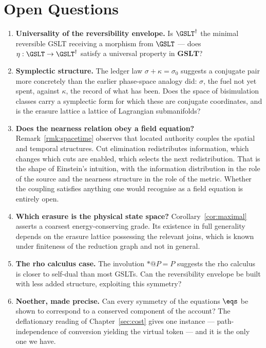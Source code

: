 \section{Open Questions}

\begin{enumerate}[itemsep=4pt]
  \item \textbf{Universality of the reversibility envelope.}  Is
        $\GSLT^\dagger$ the minimal reversible GSLT receiving a morphism
        from $\GSLT$ --- does $\eta : \GSLT \to \GSLT^\dagger$ satisfy a
        universal property in $\mathbf{GSLT}$?

  \item \textbf{Symplectic structure.}  The ledger law
        $\sigma + \kappa = \sigma_0$ suggests a conjugate pair more
        concretely than the earlier phase-space analogy did: $\sigma$, the
        fuel not yet spent, against $\kappa$, the record of what has been.
        Does the space of bisimulation classes carry a symplectic form for
        which these are conjugate coordinates, and is the erasure lattice
        a lattice of Lagrangian submanifolds?

  \item \textbf{Does the nearness relation obey a field equation?}
        Remark~\ref{rmk:spacetime} observes that located authority couples
        the spatial and temporal structures.  Cut elimination redistributes
        information, which changes which cuts are enabled, which selects
        the next redistribution.  That is the shape of Einstein's
        intuition, with the information distribution in the role of the
        source and the nearness structure in the role of the metric.
        Whether the coupling satisfies anything one would recognise as a
        field equation is entirely open.

  \item \textbf{Which erasure is the physical state space?}
        Corollary~\ref{cor:maximal} asserts a coarsest energy-conserving
        grade.  Its existence in full generality depends on the erasure
        lattice possessing the relevant joins, which is known under
        finiteness of the reduction graph and not in general.

  \item \textbf{The rho calculus case.}  The involution ${*}{@}P = P$
        suggests the rho calculus is closer to self-dual than most GSLTs.
        Can the reversibility envelope be built with less added structure,
        exploiting this symmetry?

  \item \textbf{Noether, made precise.}  Can every symmetry of the
        equations $\eqs$ be shown to correspond to a conserved component
        of the account?  The deflationary reading of
        Chapter~\ref{sec:cost} gives one instance --- path-independence of
        conversion yielding the virtual token --- and it is the only one
        we have.
\end{enumerate}


